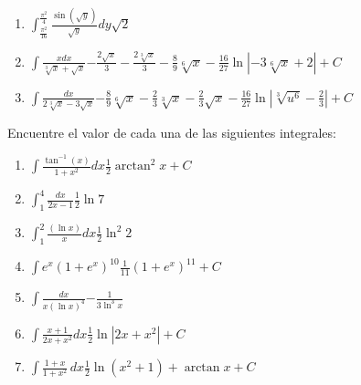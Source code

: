 {\begin{enumerate}
\item {$\displaystyle\int_{\frac{\pi ^{2}}{16}}^{\frac{\pi ^{2}}{4}}\frac{\sin (\sqrt{y})}{\sqrt{y}}dy$}{$\sqrt{2}$}

\item {$\displaystyle\int \frac{xdx}{\sqrt[3]{x}+\sqrt{x}}$}{$-\frac{2\sqrt{x}}{3}-\frac{2\sqrt[3]{x}}{3}-\frac{8}{9}\sqrt[6]{x}-\frac{16%
}{27}\ln \left\vert -3\sqrt[6]{x}+2\right\vert +C$}

\item {$\displaystyle\int \frac{dx}{2\sqrt[3]{x}-3\sqrt{x}}$}{$
	-\frac{8}{9}\sqrt[6]{x}-\frac{2}{3}\sqrt[3]{x}-\frac{2}{3}\sqrt{x}-\frac{16}{27}\ln
\left\vert \sqrt[3]{u^{6}}-\frac{2}{3}\right\vert +C$}

\end{enumerate}


\clearpage

\textnormal{Encuentre el valor de cada una de las siguientes integrales:}

\begin{enumerate}
	
\item {$\displaystyle{\int \frac{\tan ^{-1}(x)}{1+x^{2}}dx}$}{$\frac{1}{2}\arctan ^{2}x+C$}

\item {$\displaystyle{\int_{1}^{4}\frac{dx}{2x-1}}$}{$\frac{1}{2}\ln 7$}

\item {$\displaystyle{\int_{1}^{2}\frac{(\ln x)}{x}dx}$}{$\frac{1}{2}\ln ^{2}2$}

\item {$\displaystyle{\int e^{x}(1+e^{x})^{10}}$}{$\frac{1}{11}(1+e^{x})^{11}+C$}

\item {$\displaystyle{\int \frac{dx}{x(\ln x)^{4}}}$}{$-\frac{1}{3\ln ^{3}x}$}

\item {$\displaystyle{\int \frac{x+1}{2x+x^{2}}dx}$}{$\frac{1}{2}\ln \left\vert 2x+x^{2}\right\vert +C$}

\item {$\displaystyle{\int \frac{1+x}{1+x^{2}}\,dx}$}{$\frac{1}{2}\ln \left( x^{2}+1\right) +\arctan x +C$}


\end{enumerate}}
